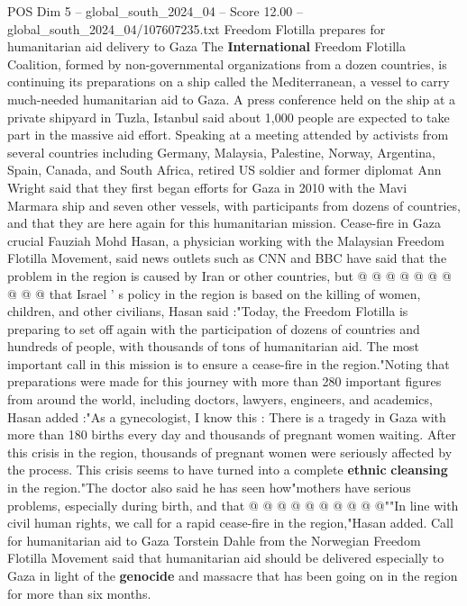 \begin{textsample}{POS Dim 5 – global\_south\_2024\_04 – Score 12.00 – global\_south\_2024\_04/107607235.txt}  \label{ex:f5_pos_334}
Freedom Flotilla prepares for humanitarian aid delivery to Gaza The \textbf{International} Freedom Flotilla Coalition, formed by non-governmental organizations from a dozen countries, is continuing its preparations on a ship called the Mediterranean, a vessel to carry much-needed humanitarian aid to Gaza.
A press conference held on the ship at a private shipyard in Tuzla, Istanbul said about 1,000 people are expected to take part in the massive aid effort.
Speaking at a meeting attended by activists from several countries including Germany, Malaysia, Palestine, Norway, Argentina, Spain, Canada, and South Africa, retired US soldier and former diplomat Ann Wright said that they first began efforts for Gaza in 2010 with the Mavi Marmara ship and seven other vessels, with participants from dozens of countries, and that they are here again for this humanitarian mission.
Cease-fire in Gaza crucial Fauziah Mohd Hasan, a physician working with the Malaysian Freedom Flotilla Movement, said news outlets such as CNN and BBC have said that the problem in the region is caused by Iran or other countries, but @ @ @ @ @ @ @ @ @ @ that Israel ' s policy in the region is based on the killing of women, children, and other civilians, Hasan said :"Today, the Freedom Flotilla is preparing to set off again with the participation of dozens of countries and hundreds of people, with thousands of tons of humanitarian aid.
The most important call in this mission is to ensure a cease-fire in the region."Noting that preparations were made for this journey with more than 280 important figures from around the world, including doctors, lawyers, engineers, and academics, Hasan added :"As a gynecologist, I know this : There is a tragedy in Gaza with more than 180 births every day and thousands of pregnant women waiting.
After this crisis in the region, thousands of pregnant women were seriously affected by the process.
This crisis seems to have turned into a complete \textbf{ethnic} \textbf{cleansing} in the region."The doctor also said he has seen how"mothers have serious problems, especially during birth, and that @ @ @ @ @ @ @ @ @ @""In line with civil human rights, we call for a rapid cease-fire in the region,"Hasan added.
Call for humanitarian aid to Gaza Torstein Dahle from the Norwegian Freedom Flotilla Movement said that humanitarian aid should be delivered especially to Gaza in light of the \textbf{genocide} and massacre that has been going on in the region for more than six months.

\end{textsample}

